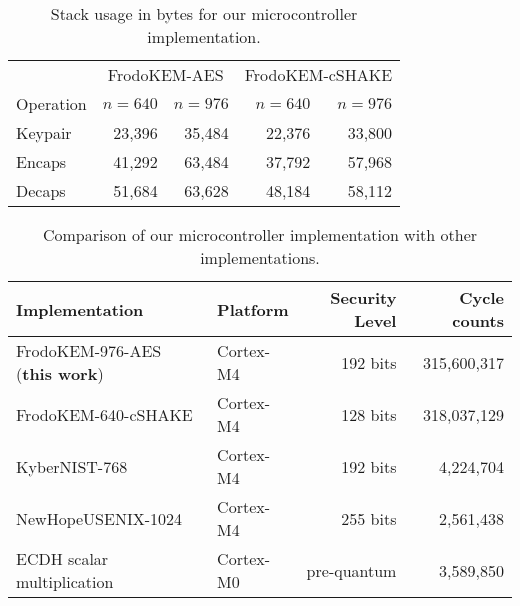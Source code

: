 \begin{table}[tbhp]
\caption{Stack usage in bytes for our microcontroller implementation.}
\label{tab:res_micro_mem}
\begin{center}
\begin{tabular}{|l|r|r|r|r|}
\hline
& \multicolumn{2}{c|}{\textsf{FrodoKEM-AES}} &\multicolumn{2}{c|}{\textsf{FrodoKEM-cSHAKE}} \\
Operation	  & $n=640$ & $n=976$ & $n=640$ & $n=976$\\
\hline
Keypair							& 23,396   & 35,484  & 22,376  & 33,800   \\
Encaps							& 41,292   & 63,484  & 37,792  & 57,968   \\
Decaps							& 51,684   & 63,628  & 48,184  & 58,112   \\
\hline
\end{tabular}
\end{center}
\end{table}


\begin{table}[tbhp]
\begin{center}
\caption{Comparison of our microcontroller implementation with other implementations.}
\label{tab:micro_comparison}
\begin{tabular}{|l|l|r|r|}
\hline
Implementation & Platform & Security Level & Cycle counts\\\hline
\textsf{FrodoKEM-976-AES} (\textbf{this work})	& Cortex-M4 & 192 bits  & 315,600,317\\
\textsf{FrodoKEM-640-cSHAKE} \cite{pqm4} & Cortex-M4 & 128 bits & 318,037,129 \\
\textsf{KyberNIST-768} \cite{pqm4} & Cortex-M4 & 192 bits & 4,224,704 \\
\textsf{NewHopeUSENIX-1024} \cite{alkim2016newhope}	& Cortex-M4 &255 bits & 2,561,438 \\
ECDH scalar multiplication \cite{DBLP:journals/dcc/DullHHHPSS15} &  Cortex-M0 & pre-quantum & 3,589,850\\
\hline
\end{tabular}
\end{center}
\end{table}


